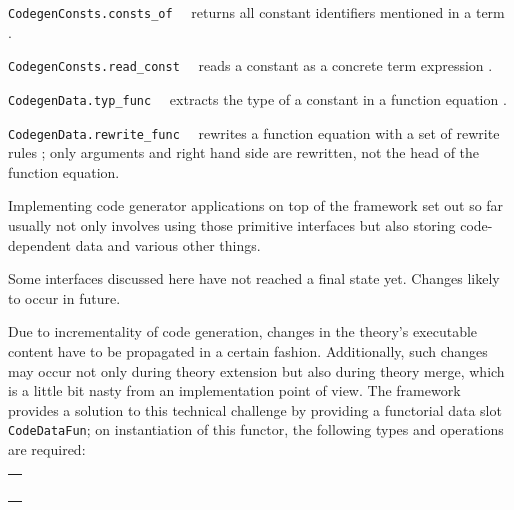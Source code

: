 \begin{isabellebody}
\begin{isamarkuptext}
\begin{description}
  \item \verb|CodegenConsts.consts_of|~~
     returns all constant identifiers mentioned in a term .

  \item \verb|CodegenConsts.read_const|~~
     reads a constant as a concrete term expression .

  \item \verb|CodegenData.typ_func|~~
     extracts the type of a constant in a function equation .

  \item \verb|CodegenData.rewrite_func|~~
     rewrites a function equation  with a set of rewrite
     rules ; only arguments and right hand side are rewritten,
     not the head of the function equation.

  \end{description}%
\end{isamarkuptext}%
\isamarkuptrue%
%
\endisatagmlref
{\isafoldmlref}%
%
\isadelimmlref
%
\endisadelimmlref
%
\isamarkuptrue%
%
\begin{isamarkuptext}%
Implementing code generator applications on top
  of the framework set out so far usually not only
  involves using those primitive interfaces
  but also storing code-dependent data and various
  other things.

  \begin{warn}
    Some interfaces discussed here have not reached
    a final state yet.
    Changes likely to occur in future.
  \end{warn}%
\end{isamarkuptext}%
\isamarkuptrue%
%
\isamarkuptrue%
%
\begin{isamarkuptext}%
Due to incrementality of code generation, changes in the
  theory's executable content have to be propagated in a
  certain fashion.  Additionally, such changes may occur
  not only during theory extension but also during theory
  merge, which is a little bit nasty from an implementation
  point of view.  The framework provides a solution
  to this technical challenge by providing a functorial
  data slot \verb|CodeDataFun|; on instantiation
  of this functor, the following types and operations
  are required:

  \medskip
  \begin{tabular}{l}
  \isa{val\ name{\isacharcolon}\ string} \\
  \isa{type\ T} \\
  \isa{val\ empty{\isacharcolon}\ T} \\
  \isa{val\ merge{\isacharcolon}\ Pretty{\isachardot}pp\ {\isasymrightarrow}\ T\ {\isacharasterisk}\ T\ {\isasymrightarrow}\ T} \\
  \isa{val\ purge{\isacharcolon}\ theory\ option\ {\isasymrightarrow}\ CodegenConsts{\isachardot}const\ list\ option\ {\isasymrightarrow}\ T\ {\isasymrightarrow}\ T}
  \end{tabular}


\end{isamarkuptext}
\end{isabellebody}
